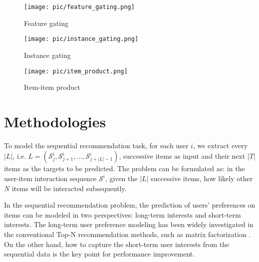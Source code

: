 \documentclass[sigconf]{acmart}
\begin{document}
\begin{figure*}[t!]
    \centering
    \begin{subfigure}[t]{0.33\textwidth}
        \centering
        \texttt{[image: pic/feature\_gating.png]}
        \caption{\label{fig:feature_gating}Feature gating}
    \end{subfigure}\begin{subfigure}[t]{0.33\textwidth}
        \centering
        \texttt{[image: pic/instance\_gating.png]}
        \caption{\label{fig:instance_gating}Instance gating}
    \end{subfigure}\begin{subfigure}[t]{0.33\textwidth}
        \centering
        \texttt{[image: pic/item\_product.png]}
        \caption{\label{fig:item_product}Item-item product}
    \end{subfigure}
    \caption{\label{fig:three_modules}An illustrative example of the feature gating, instance gating, and item-item product modules. In Figure \ref{fig:feature_gating}, the gray lines on items denote those latent features are masked off. In Figure \ref{fig:instance_gating}, the darker blue means the item is more important. In Figure \ref{fig:item_product}, the line linked between two items denotes the inner product, which captures the relations between the items users have accessed and the items users will access in the future.}
\end{figure*}


\section{Methodologies}
To model the sequential recommendation task, for each user $ i $, we extract every $ |L| $, i.e. $ L=(\mathcal{S}_{j}^{i}, \mathcal{S}_{j + 1}^{i},...,\mathcal{S}_{j + |L| - 1}^{i}) $, successive items as input and their next $ |T| $ items as the targets to be predicted. The problem can be formulated as: in the user-item interaction sequence $ \mathcal{S}^{i} $, given the $ |L| $ successive items, how likely other $ N $ items will be interacted subsequently.

In the sequential recommendation problem, the prediction of users' preferences on items can be modeled in two perspectives: long-term interests and short-term interests. The long-term user preference modeling has been widely investigated in the conventional Top-N recommendation methods, such as matrix factorization \cite{DBLP:conf/icdm/HuKV08,DBLP:conf/uai/RendleFGS09}. On the other hand, how to capture the short-term user interests from the sequential data is the key point for performance improvement.
\end{document}
